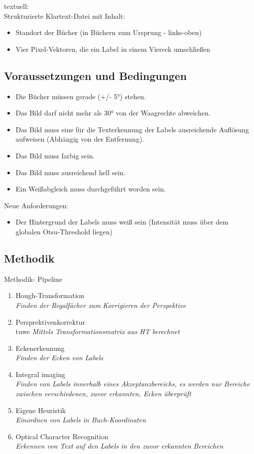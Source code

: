 \documentclass[paper=A4, deutsch]{scrartcl}
\begin{document}
\noindent textuell:\\
Strukturierte Klartext-Datei mit Inhalt:
\begin{itemize}
  \item Standort der Bücher (in Büchern zum Ursprung - links-oben)
  \item Vier Pixel-Vektoren, die ein Label in einem Viereck umschließen
\end{itemize}

\subsection{Voraussetzungen und Bedingungen}
\begin{itemize}
  \item Die Bücher müssen gerade (+/- 5°) stehen.
  \item Das Bild darf nicht mehr als 30° von der Waagrechte abweichen.
  \item Das Bild muss eine für die Texterkennung der Labels ausreichende Auflösung aufweisen (Abhängig von der Entfernung).
  \item Das Bild muss farbig sein.
  \item Das Bild muss ausreichend hell sein. 
  \item Ein Weißabgleich muss durchgeführt worden sein.
\end{itemize}

Neue Anforderungen:
\begin{itemize}
  \item Der Hintergrund der Labels muss weiß sein (Intensität muss über dem globalen Otsu-Threshold liegen)
\end{itemize}

\subsection{Methodik}
Methodik- Pipeline
\begin{enumerate}
	\item Hough-Transformation\\
		\textit{Finden der Regalfächer zum Korrigieren der Perspektive}
	\item Persprektivenkorrektur\\tuwe
		\textit{Mittels Transformationsmatrix aus HT berechnet}
	\item Eckenerkennung\\
		\textit{Finden der Ecken von Labels}
	\item Integral imaging\\
		\textit{Finden von Labels innerhalb eines Akzeptanzbereichs, es werden nur Bereiche zwischen verschiedenen, zuvor erkannten, Ecken überprüft}
	\item Eigene Heuristik\\
		\textit{Einordnen von Labels in Buch-Koordinaten}
	\item Optical Character Recognition\\
		\textit{Erkennen von Text auf den Labels in den zuvor erkannten Bereichen}
\end{enumerate}
\end{document}
